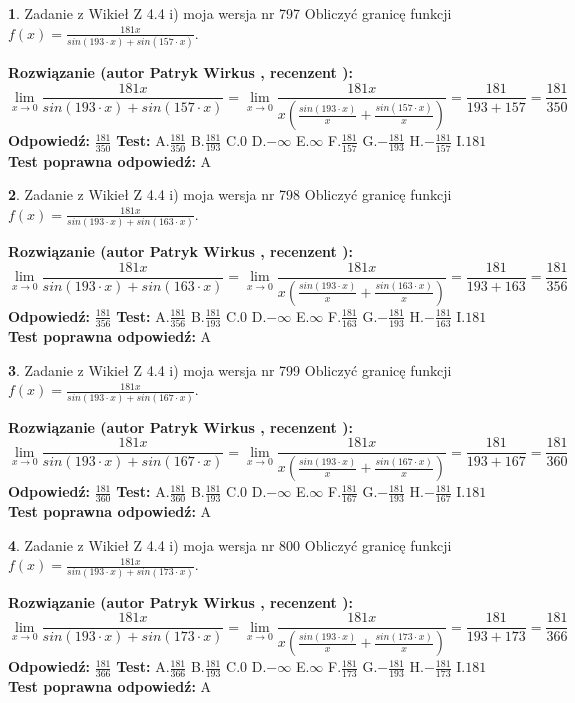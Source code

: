 \documentclass[12pt, a4paper]{article}
\theoremstyle{definition} %
\newtheorem{zad}{}
\newcommand{\zadStart}[1]{\begin{zad}#1\newline}
\newcommand{\zadStop}{\end{zad}}
\newcommand{\rozwStart}[2]{\noindent \textbf{Rozwiązanie (autor #1 , recenzent #2): }\newline}
\newcommand{\rozwStop}{\newline}
\newcommand{\odpStart}{\noindent \textbf{Odpowiedź:}\newline}
\newcommand{\odpStop}{\newline}
\newcommand{\testStart}{\noindent \textbf{Test:}\newline}
\newcommand{\testStop}{\newline}
\newcommand{\kluczStart}{\noindent \textbf{Test poprawna odpowiedź:}\newline}
\newcommand{\kluczStop}{\newline}
\begin{document}
\zadStart{Zadanie z Wikieł Z 4.4 i) moja wersja nr 797}
Obliczyć granicę funkcji $f(x)=\frac{181x}{sin(193\cdot x) +sin(157\cdot x)}$.
\zadStop
\rozwStart{Patryk Wirkus}{}
$$\lim\limits_{x\to 0}\frac{181x}{sin(193\cdot x) +sin(157\cdot x)}=\lim\limits_{x\to 0}\frac{181x}{x(\frac{sin(193\cdot x)}{x}+\frac{sin(157\cdot x)}{x})}=\frac{181}{193+157} = \frac{181}{350}$$
\rozwStop
\odpStart
$\frac{181}{350}$
\odpStop
\testStart
A.$\frac{181}{350}$
B.$\frac{181}{193}$
C.$0$
D.$-\infty$
E.$\infty$
F.$\frac{181}{157}$
G.$-\frac{181}{193}$
H.$-\frac{181}{157}$
I.$181$
\testStop
\kluczStart
A
\kluczStop



\zadStart{Zadanie z Wikieł Z 4.4 i) moja wersja nr 798}
Obliczyć granicę funkcji $f(x)=\frac{181x}{sin(193\cdot x) +sin(163\cdot x)}$.
\zadStop
\rozwStart{Patryk Wirkus}{}
$$\lim\limits_{x\to 0}\frac{181x}{sin(193\cdot x) +sin(163\cdot x)}=\lim\limits_{x\to 0}\frac{181x}{x(\frac{sin(193\cdot x)}{x}+\frac{sin(163\cdot x)}{x})}=\frac{181}{193+163} = \frac{181}{356}$$
\rozwStop
\odpStart
$\frac{181}{356}$
\odpStop
\testStart
A.$\frac{181}{356}$
B.$\frac{181}{193}$
C.$0$
D.$-\infty$
E.$\infty$
F.$\frac{181}{163}$
G.$-\frac{181}{193}$
H.$-\frac{181}{163}$
I.$181$
\testStop
\kluczStart
A
\kluczStop



\zadStart{Zadanie z Wikieł Z 4.4 i) moja wersja nr 799}
Obliczyć granicę funkcji $f(x)=\frac{181x}{sin(193\cdot x) +sin(167\cdot x)}$.
\zadStop
\rozwStart{Patryk Wirkus}{}
$$\lim\limits_{x\to 0}\frac{181x}{sin(193\cdot x) +sin(167\cdot x)}=\lim\limits_{x\to 0}\frac{181x}{x(\frac{sin(193\cdot x)}{x}+\frac{sin(167\cdot x)}{x})}=\frac{181}{193+167} = \frac{181}{360}$$
\rozwStop
\odpStart
$\frac{181}{360}$
\odpStop
\testStart
A.$\frac{181}{360}$
B.$\frac{181}{193}$
C.$0$
D.$-\infty$
E.$\infty$
F.$\frac{181}{167}$
G.$-\frac{181}{193}$
H.$-\frac{181}{167}$
I.$181$
\testStop
\kluczStart
A
\kluczStop



\zadStart{Zadanie z Wikieł Z 4.4 i) moja wersja nr 800}
Obliczyć granicę funkcji $f(x)=\frac{181x}{sin(193\cdot x) +sin(173\cdot x)}$.
\zadStop
\rozwStart{Patryk Wirkus}{}
$$\lim\limits_{x\to 0}\frac{181x}{sin(193\cdot x) +sin(173\cdot x)}=\lim\limits_{x\to 0}\frac{181x}{x(\frac{sin(193\cdot x)}{x}+\frac{sin(173\cdot x)}{x})}=\frac{181}{193+173} = \frac{181}{366}$$
\rozwStop
\odpStart
$\frac{181}{366}$
\odpStop
\testStart
A.$\frac{181}{366}$
B.$\frac{181}{193}$
C.$0$
D.$-\infty$
E.$\infty$
F.$\frac{181}{173}$
G.$-\frac{181}{193}$
H.$-\frac{181}{173}$
I.$181$
\testStop
\kluczStart
A
\kluczStop
\end{document}
